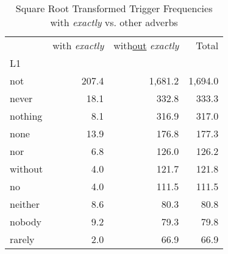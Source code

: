 
\begin{table}[ht]
\caption{Square Root Transformed Trigger Frequencies\\with \textit{exactly} vs. other adverbs}
\label{trig-exactly-others}
\begin{tabular}{lrrr}
\toprule
 & with \textit{exactly} & with\underline{out} \textit{exactly} & Total \\
L1 &  &  &  \\
\midrule
not & {\cellcolor[HTML]{081D58}} \color[HTML]{F1F1F1} 207.4 & {\cellcolor[HTML]{081D58}} \color[HTML]{F1F1F1} 1,681.2 & {\cellcolor[HTML]{081D58}} \color[HTML]{F1F1F1} 1,694.0 \\
never & {\cellcolor[HTML]{F4FBC0}} \color[HTML]{000000} 18.1 & {\cellcolor[HTML]{DAF0B3}} \color[HTML]{000000} 332.8 & {\cellcolor[HTML]{DAF0B3}} \color[HTML]{000000} 333.3 \\
nothing & {\cellcolor[HTML]{FAFDCF}} \color[HTML]{000000} 8.1 & {\cellcolor[HTML]{DCF1B2}} \color[HTML]{000000} 316.9 & {\cellcolor[HTML]{DDF2B2}} \color[HTML]{000000} 317.0 \\
none & {\cellcolor[HTML]{F7FCC6}} \color[HTML]{000000} 13.9 & {\cellcolor[HTML]{F1FABB}} \color[HTML]{000000} 176.8 & {\cellcolor[HTML]{F1FABB}} \color[HTML]{000000} 177.3 \\
nor & {\cellcolor[HTML]{FCFED1}} \color[HTML]{000000} 6.8 & {\cellcolor[HTML]{F6FBC5}} \color[HTML]{000000} 126.0 & {\cellcolor[HTML]{F6FBC5}} \color[HTML]{000000} 126.2 \\
without & {\cellcolor[HTML]{FDFED5}} \color[HTML]{000000} 4.0 & {\cellcolor[HTML]{F6FBC5}} \color[HTML]{000000} 121.7 & {\cellcolor[HTML]{F6FBC5}} \color[HTML]{000000} 121.8 \\
no & {\cellcolor[HTML]{FDFED5}} \color[HTML]{000000} 4.0 & {\cellcolor[HTML]{F7FCC7}} \color[HTML]{000000} 111.5 & {\cellcolor[HTML]{F7FCC7}} \color[HTML]{000000} 111.5 \\
neither & {\cellcolor[HTML]{FAFDCF}} \color[HTML]{000000} 8.6 & {\cellcolor[HTML]{FAFDCE}} \color[HTML]{000000} 80.3 & {\cellcolor[HTML]{FAFDCE}} \color[HTML]{000000} 80.8 \\
nobody & {\cellcolor[HTML]{FAFDCE}} \color[HTML]{000000} 9.2 & {\cellcolor[HTML]{FAFDCE}} \color[HTML]{000000} 79.3 & {\cellcolor[HTML]{FAFDCE}} \color[HTML]{000000} 79.8 \\
rarely & {\cellcolor[HTML]{FFFFD9}} \color[HTML]{000000} 2.0 & {\cellcolor[HTML]{FBFDD0}} \color[HTML]{000000} 66.9 & {\cellcolor[HTML]{FBFDD0}} \color[HTML]{000000} 66.9 \\

\end{tabular}
\end{table}
